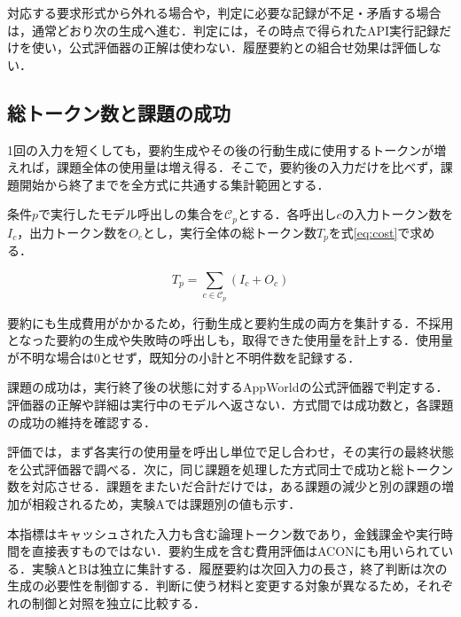 \documentclass[letter]{ieicej}
\begin{document}
対応する要求形式から外れる場合や，判定に必要な記録が不足・矛盾する場合は，通常どおり次の生成へ進む．判定には，その時点で得られたAPI実行記録だけを使い，公式評価器の正解は使わない．履歴要約との組合せ効果は評価しない．

\subsection{総トークン数と課題の成功}

1回の入力を短くしても，要約生成やその後の行動生成に使用するトークンが増えれば，課題全体の使用量は増え得る．そこで，要約後の入力だけを比べず，課題開始から終了までを全方式に共通する集計範囲とする．

\par\noindent\begin{minipage}{\columnwidth}
\setlength{\abovedisplayskip}{4pt}\setlength{\belowdisplayskip}{4pt}
条件$p$で実行したモデル呼出しの集合を$\mathcal C_p$とする．各呼出し$c$の入力トークン数を$I_c$，出力トークン数を$O_c$とし，実行全体の総トークン数$T_p$を\mbox{式\eqref{eq:cost}で求める．}

\begin{equation}
 T_p=\sum_{c\in\mathcal C_p}(I_c+O_c)
 \label{eq:cost}
\end{equation}

要約にも生成費用がかかるため，行動生成と要約生成の両方を集計する．不採用となった要約の生成や失敗時の呼出しも，取得できた使用量を計上する．使用量が不明な場合は0とせず，既知分の小計と不明件数を記録する．

\end{minipage}\par{}

課題の成功は，実行終了後の状態に対するAppWorld\cite{trivedi2024appworld}の公式評価器で判定する．評価器の正解や詳細は実行中のモデルへ返さない．方式間では成功数と，各課題の成功の維持を確認する．

評価では，まず各実行の使用量を呼出し単位で足し合わせ，その実行の最終状態を公式評価器で調べる．次に，同じ課題を処理した方式同士で成功と総トークン数を対応させる．課題をまたいだ合計だけでは，ある課題の減少と別の課題の増加が相殺されるため，実験Aでは課題別の値も示す．

本指標はキャッシュされた入力も含む論理トークン数であり，金銭課金や実行時間を直接表すものではない\cite{xu2026tokenpilot}．要約生成を含む費用評価はACON\cite{kang2026acon}にも用いられている．実験AとBは独立に集計する．履歴要約は次回入力の長さ，終了判断は次の生成の必要性を制御する．判断に使う材料と変更する対象が異なるため，それぞれの制御と対照を独立に比較する．
\end{document}
